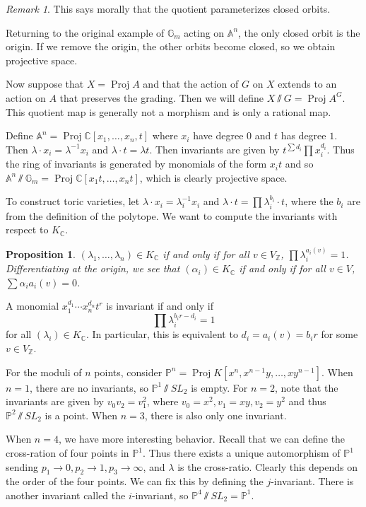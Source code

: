 \documentclass[leqno, openany]{memoir}
\newtheorem{prop}[thm]{Proposition}
\theoremstyle{definition}
\theoremstyle{remark}
\newtheorem{rmk}[thm]{Remark}
\theoremstyle{plain}
\theoremstyle{definition}
\theoremstyle{remark}
\newcommand{\A}{\mathbb{A}}
\newcommand{\C}{\mathbb{C}}
\newcommand{\Z}{\mathbb{Z}}
\renewcommand{\P}{\mathbb{P}}
\DeclareMathOperator{\Proj}{Proj}
\begin{document}
\begin{rmk}
    This says morally that the quotient parameterizes closed orbits.
\end{rmk}

Returning to the original example of $\mathbb{G}_m$ acting on $\A^n$, the only closed orbit is the origin. If we remove the origin, the other orbits become closed, so we obtain projective space.

Now suppose that $X = \Proj A$ and that the action of $G$ on $X$ extends to an action on $A$ that preserves the grading. Then we will define $X \sslash G = \Proj A^G$. This quotient map is generally not a morphism and is only a rational map.

Define $\A^n = \Proj \C[x_1, \ldots, x_n,t]$ where $x_i$ have degree $0$ and $t$ has degree $1$. Then $\lambda \cdot x_i = \lambda^{-1} x_i$ and $\lambda \cdot t = \lambda t$. Then invariants are given by $t^{\sum d_i} \prod x_i^{d_i}$. Thus the ring of invariants is generated by monomials of the form $x_it$ and so $\A^n \sslash \mathbb{G}_m = \Proj \C[x_1 t, \ldots, x_n t]$, which is clearly projective space.

To construct toric varieties, let $\lambda \cdot x_i = \lambda_i^{-1} x_i$ and $\lambda \cdot t = \prod \lambda_i^{b_i} \cdot t$, where the $b_i$ are from the definition of the polytope. We want to compute the invariants with respect to $K_{\C}$.

\begin{prop}
    $(\lambda_1, \ldots, \lambda_n) \in K_{\C}$ if and only if for all $v \in V_{\Z}$, $\prod \lambda_i^{a_i(v)} = 1$. Differentiating at the origin, we see that $(\alpha_i) \in K_{\C}$ if and only if for all $v\in V$, $\sum \alpha_i a_i(v) = 0$.
\end{prop}

A monomial $x_1^{d_1} \cdots x_n^{d_n} t^r$ is invariant if and only if 
\[ \prod \lambda_i^{b_i r - d_i} = 1 \]
for all $(\lambda_i) \in K_{\C}$. In particular, this is equivalent to $d_i = a_i(v) = b_i r$ for some $v \in V_{\Z}$.

For the moduli of $n$ points, consider $\P^n = \Proj K[x^n, x^{n-1} y, \ldots, xy^{n-1}]$. When $n = 1$, there are no invariants, so $\P^1 \sslash SL_2$ is empty. For $n = 2$, note that the invariants are given by $v_0v_2 = v_1^2$, where $v_0 = x^2, v_1 = xy, v_2 = y^2$ and thus $\P^2 \sslash SL_2$ is a point. When $n = 3$, there is also only one invariant.

When $n = 4$, we have more interesting behavior. Recall that we can define the cross-ration of four points in $\P^1$. Thus there exists a unique automorphism of $\P^1$ sending $p_1 \to 0, p_2 \to 1, p_3 \to \infty$, and $\lambda$ is the cross-ratio. Clearly this depends on the order of the four points. We can fix this by defining the $j$-invariant. There is another invariant called the $i$-invariant, so $\P^4 \sslash SL_2 = \P^1$.
\end{document}

